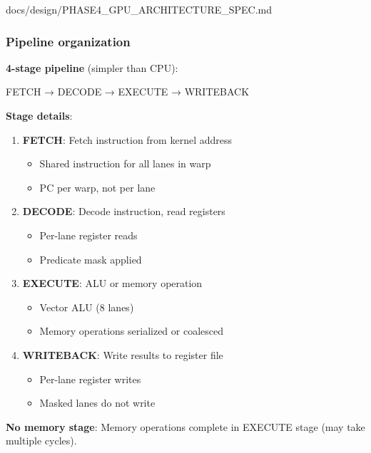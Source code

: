 \begin{relocated}{docs/design/PHASE4_GPU_ARCHITECTURE_SPEC.md}
\subsubsection{Pipeline organization}\label{ds:ch:phase4-gpu-architecture:pipeline-organization}

\textbf{4-stage pipeline} (simpler than CPU):

\begin{textblock}
FETCH → DECODE → EXECUTE → WRITEBACK
\end{textblock}

\textbf{Stage details}:

\begin{enumerate}
\def\labelenumi{\arabic{enumi}.}
\item
  \textbf{FETCH}: Fetch instruction from kernel address

  \begin{itemize}
  \tightlist
  \item
    Shared instruction for all lanes in warp
  \item
    PC per warp, not per lane
  \end{itemize}
\item
  \textbf{DECODE}: Decode instruction, read registers

  \begin{itemize}
  \tightlist
  \item
    Per-lane register reads
  \item
    Predicate mask applied
  \end{itemize}
\item
  \textbf{EXECUTE}: ALU or memory operation

  \begin{itemize}
  \tightlist
  \item
    Vector ALU (8 lanes)
  \item
    Memory operations serialized or coalesced
  \end{itemize}
\item
  \textbf{WRITEBACK}: Write results to register file

  \begin{itemize}
  \tightlist
  \item
    Per-lane register writes
  \item
    Masked lanes do not write
  \end{itemize}
\end{enumerate}

\textbf{No memory stage}: Memory operations complete in EXECUTE stage
(may take multiple cycles).


\end{relocated}
